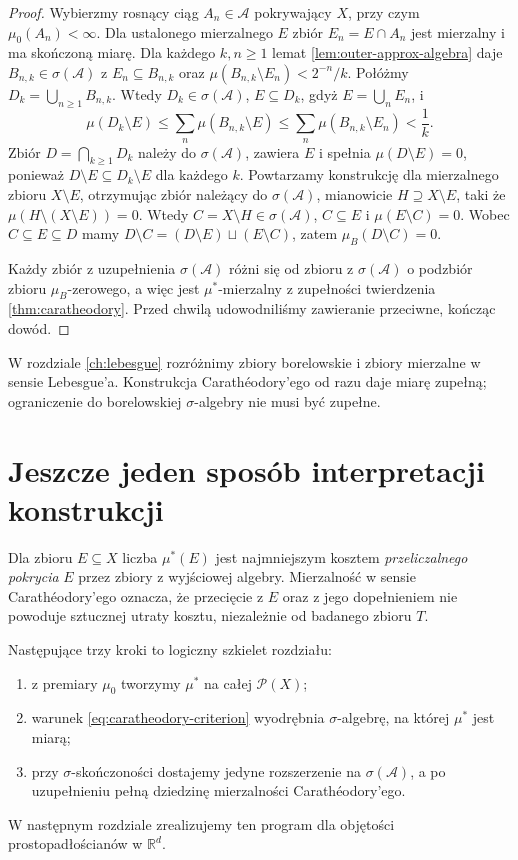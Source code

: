 \begin{proof}
Wybierzmy rosnący ciąg $A_n\in\mathcal A$ pokrywający $X$,
przy czym $\mu_0(A_n)<\infty$. Dla ustalonego mierzalnego
$E$ zbiór $E_n=E\cap A_n$ jest mierzalny i ma skończoną miarę.
Dla każdego $k,n\ge1$ lemat \ref{lem:outer-approx-algebra}
daje $B_{n,k}\in\sigma(\mathcal A)$ z
$E_n\subseteq B_{n,k}$ oraz
$\mu(B_{n,k}\setminus E_n)<2^{-n}/k$.
Połóżmy $D_k=\bigcup_{n\ge1}B_{n,k}$.
Wtedy $D_k\in\sigma(\mathcal A)$,
$E\subseteq D_k$, gdyż $E=\bigcup_nE_n$, i
\[
\mu(D_k\setminus E)
\le\sum_n\mu(B_{n,k}\setminus E)
\le\sum_n\mu(B_{n,k}\setminus E_n)<\frac1k.
\]
Zbiór $D=\bigcap_{k\ge1}D_k$ należy do
$\sigma(\mathcal A)$, zawiera $E$ i spełnia
$\mu(D\setminus E)=0$, ponieważ
$D\setminus E\subseteq D_k\setminus E$ dla każdego $k$.
Powtarzamy konstrukcję dla mierzalnego zbioru
$X\setminus E$, otrzymując zbiór należący do
$\sigma(\mathcal A)$, mianowicie $H\supseteq X\setminus E$,
taki że $\mu(H\setminus(X\setminus E))=0$.
Wtedy $C=X\setminus H\in\sigma(\mathcal A)$,
$C\subseteq E$ i $\mu(E\setminus C)=0$.
Wobec $C\subseteq E\subseteq D$ mamy
$D\setminus C=(D\setminus E)\sqcup(E\setminus C)$,
zatem $\mu_B(D\setminus C)=0$.

Każdy zbiór z uzupełnienia $\sigma(\mathcal A)$ różni
się od zbioru z $\sigma(\mathcal A)$ o podzbiór
zbioru $\mu_B$-zerowego, a więc jest
$\mu^*$-mierzalny z zupełności twierdzenia
\ref{thm:caratheodory}. Przed chwilą udowodniliśmy
zawieranie przeciwne, kończąc dowód.
\end{proof}

\begin{uwaga}
W rozdziale \ref{ch:lebesgue} rozróżnimy zbiory borelowskie
i zbiory mierzalne w sensie Lebesgue'a. Konstrukcja
Carathéodory'ego od razu daje miarę zupełną; ograniczenie
do borelowskiej $\sigma$-algebry nie musi być zupełne.
\end{uwaga}

\section{Jeszcze jeden sposób interpretacji konstrukcji}

Dla zbioru $E\subseteq X$ liczba $\mu^*(E)$ jest
najmniejszym kosztem \emph{przeliczalnego pokrycia} $E$
przez zbiory z wyjściowej algebry. Mierzalność w sensie
Carathéodory'ego oznacza, że przecięcie z $E$ oraz z jego
dopełnieniem nie powoduje sztucznej utraty kosztu,
niezależnie od badanego zbioru $T$.

Następujące trzy kroki to logiczny szkielet rozdziału:
\begin{enumerate}
\item z premiary $\mu_0$ tworzymy $\mu^*$ na całej $\mathcal P(X)$;
\item warunek \eqref{eq:caratheodory-criterion} wyodrębnia
$\sigma$-algebrę, na której $\mu^*$ jest miarą;
\item przy $\sigma$-skończoności dostajemy jedyne
rozszerzenie na $\sigma(\mathcal A)$, a po uzupełnieniu
pełną dziedzinę mierzalności Carathéodory'ego.
\end{enumerate}
W następnym rozdziale zrealizujemy ten program dla
objętości prostopadłościanów w $\mathbb R^d$.
